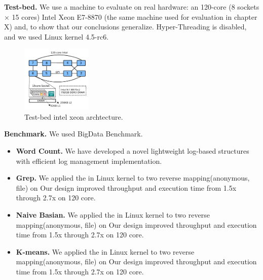 \ifkor
\noindent
\textbf{Test-bed. }
We use a machine to evaluate on real hardware: an 120-core (8 sockets × 15
cores) Intel Xeon E7-8870 (the same machine used for evaluation in chapter X)
and, to show that our conclusions generalize.
Hyper-Threading is disabled, and we used Linux kernel 4.5-rc6.

\begin{figure}[h]
  \begin{center}
     \includegraphics[width=0.3\textwidth]{fig/xeon}
  \end{center}
  \caption{Test-bed intel xeon archtecture.}
  \label{fig:basic}
\end{figure}
\else

\fi

\ifkor
\noindent
\textbf{Benchmark.} We used BigData Benchmark.
\begin{itemize}
\item \textbf{Word Count. }We have developed a novel lightweight log-based
structures with efficient log management implementation.
\item \textbf{Grep. }
We applied the in Linux kernel to two reverse mapping(anonymous, file) on
Our design improved throughput and execution time from 1.5x through 2.7x on 120 core.
\item \textbf{Naive Basian. }
We applied the in Linux kernel to two reverse mapping(anonymous, file) on
Our design improved throughput and execution time from 1.5x through 2.7x on 120 core.
\item \textbf{K-means.}
We applied the in Linux kernel to two reverse mapping(anonymous, file) on
Our design improved throughput and execution time from 1.5x through 2.7x on 120 core.
\end{itemize}
\else

